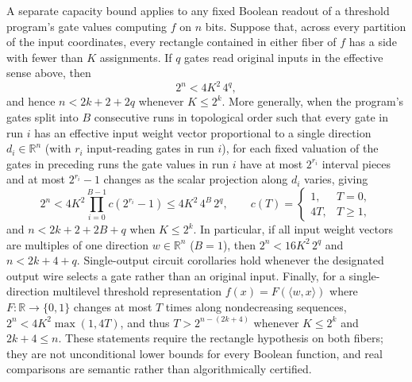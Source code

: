 \begin{result}
A separate capacity bound applies to any fixed Boolean readout of a threshold
program's gate values computing $f$ on $n$ bits. Suppose that, across every
partition of the input coordinates, every rectangle contained in either fiber
of $f$ has a side with fewer than $K$ assignments. If $q$ gates read original
inputs in the effective sense above, then
\[
2^n<4K^2\,4^q,
\]
and hence $n<2k+2+2q$ whenever $K\le 2^k$. More generally, when the program's
gates split into $B$ consecutive runs in topological order such that every
gate in run $i$ has an effective input weight vector proportional to a single
direction $d_i\in\mathbb R^n$ (with $r_i$ input-reading gates in run $i$), for
each fixed valuation of the gates in preceding runs the gate values in run $i$
have at most $2^{r_i}$ interval pieces and at most $2^{r_i}-1$ changes as the
scalar projection along $d_i$ varies, giving
\[
2^n < 4K^2\prod_{i=0}^{B-1} c(2^{r_i}-1) \le 4K^2\,4^B\,2^q,
\qquad c(T)=\begin{cases}1,&T=0,\\ 4T,&T\ge 1,\end{cases}
\]
and $n<2k+2+2B+q$ when $K\le 2^k$. In particular, if all input weight vectors
are multiples of one direction $w\in\mathbb R^n$ ($B=1$), then
$2^n<16K^2\,2^q$ and $n<2k+4+q$. Single-output circuit corollaries hold
whenever the designated output wire selects a gate rather than an original
input. Finally, for a single-direction multilevel threshold representation
$f(x)=F(\langle w,x\rangle)$ where $F:\mathbb R\to\{0,1\}$ changes at most $T$
times along nondecreasing sequences, $2^n<4K^2\max(1,4T)$, and thus
$T>2^{n-(2k+4)}$ whenever $K\le 2^k$ and $2k+4\le n$.
These statements require the rectangle hypothesis on both fibers; they are not
unconditional lower bounds for every Boolean function, and real comparisons are
semantic rather than algorithmically certified.\citep{Schlesinger2026Algebraic}

\end{result}
